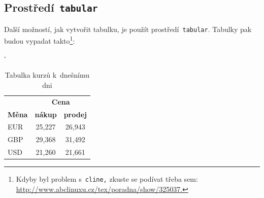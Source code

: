 \documentclass[11pt]{article}
\begin{document}
\subsection{Prostředí\texttt{ tabular}}

Další možností, jak vytvořit tabulku, je použít prostředí\texttt{ tabular}. Tabulky pak budou vypadat takto\footnote{Kdyby byl problem s\texttt{ cline,} zkuste se podívat třeba sem: \url{http://www.abclinuxu.cz/tex/poradna/show/325037.}}:
\bigskip

\begin{table}[h]
\centering
\catcode`
\begin{tabular}{|l|c|c|}
    \hline
                    &   \multicolumn{2}{c|}{\bfseries Cena} \\ \cline{2-3} 
    \bfseries Měna  &  \bfseries nákup  & \bfseries prodej  \\ \hline
        EUR         &   25,227          &   26,943          \\ \hline
        GBP         &   29,368          &   31,492          \\ \hline
        USD         &   21,260          &   21,661          \\ \hline
\end{tabular}
\caption{Tabulka kurzů k~dnešnímu dni}
\label{tab1}
\end{table}

\bigskip
\end{document}
